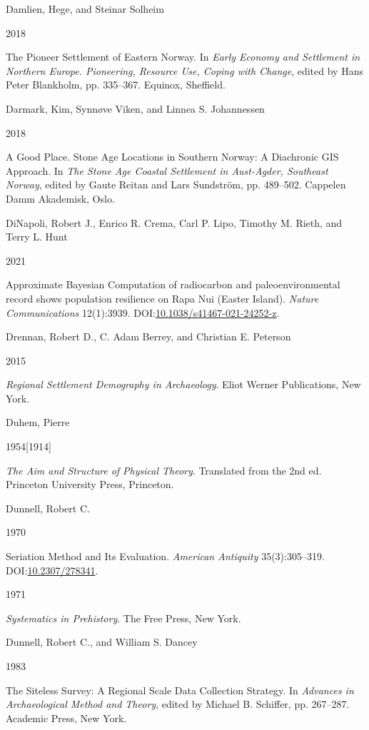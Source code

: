 \documentclass[
  12pt,
  a4paper,
  oneside]{book}
\newlength{\cslhangindent}
\newlength{\csllabelwidth}
\newlength{\cslentryspacingunit} %
\newenvironment{CSLReferences}[2] %
 {%
  \setlength{\parindent}{0pt}
  \ifodd #1
  \let\oldpar\par
  \def\par{\hangindent=\cslhangindent\oldpar}
  \fi
  \setlength{\parskip}{#2\cslentryspacingunit}
 }%
 {}
\newcommand{\CSLBlock}[1]{#1\hfill\break}
\newcommand{\CSLLeftMargin}[1]{\parbox[t]{\csllabelwidth}{#1}}
\newcommand{\CSLRightInline}[1]{\parbox[t]{\linewidth - \csllabelwidth}{#1}\break}
\begin{document}
\begin{CSLReferences}{0}{0}
\leavevmode{}%
\CSLBlock{Damlien, Hege, and Steinar Solheim}
\CSLLeftMargin{ 2018}%
\CSLRightInline{{The Pioneer Settlement of Eastern Norway}. In \emph{{Early Economy and Settlement in Northern Europe. Pioneering, Resource Use, Coping with Change}}, edited by Hans Peter Blankholm, pp. 335--367. Equinox, Sheffield.}

\leavevmode{}%
\CSLBlock{Darmark, Kim, Synnøve Viken, and Linnea S. Johannessen}
\CSLLeftMargin{ 2018}%
\CSLRightInline{{A Good Place. Stone Age Locations in Southern Norway: A Diachronic GIS Approach}. In \emph{{The Stone Age Coastal Settlement in Aust-Agder, Southeast Norway}}, edited by Gaute Reitan and Lars Sundström, pp. 489--502. Cappelen Damm Akademisk, Oslo.}

\leavevmode{}%
\CSLBlock{DiNapoli, Robert J., Enrico R. Crema, Carl P. Lipo, Timothy M. Rieth, and Terry L. Hunt}
\CSLLeftMargin{ 2021}%
\CSLRightInline{{Approximate Bayesian Computation of radiocarbon and paleoenvironmental record shows population resilience on Rapa Nui (Easter Island)}. \emph{Nature Communications} 12(1):3939. DOI:\href{https://doi.org/10.1038/s41467-021-24252-z}{10.1038/s41467-021-24252-z}.}

\leavevmode{}%
\CSLBlock{Drennan, Robert D., C. Adam Berrey, and Christian E. Peterson}
\CSLLeftMargin{ 2015}%
\CSLRightInline{\emph{{Regional Settlement Demography in Archaeology}}. Eliot Werner Publications, New York.}

\leavevmode{}%
\CSLBlock{Duhem, Pierre}
\CSLLeftMargin{ 1954{[}1914{]}}%
\CSLRightInline{\emph{{The Aim and Structure of Physical Theory}}. Translated from the 2nd ed. Princeton University Press, Princeton.}

\leavevmode{}%
\CSLBlock{Dunnell, Robert C.}
\CSLLeftMargin{ 1970}%
\CSLRightInline{{Seriation Method and Its Evaluation}. \emph{American Antiquity} 35(3):305--319. DOI:\href{https://doi.org/10.2307/278341}{10.2307/278341}.}

\leavevmode{}%
\CSLLeftMargin{ 1971 }%
\CSLRightInline{\emph{{Systematics in Prehistory}}. The Free Press, New York.}

\leavevmode{}%
\CSLBlock{Dunnell, Robert C., and William S. Dancey}
\CSLLeftMargin{ 1983}%
\CSLRightInline{{The Siteless Survey: A Regional Scale Data Collection Strategy}. In \emph{{Advances in Archaeological Method and Theory}}, edited by Michael B. Schiffer, pp. 267--287. Academic Press, New York.}


\end{CSLReferences}
\end{document}
